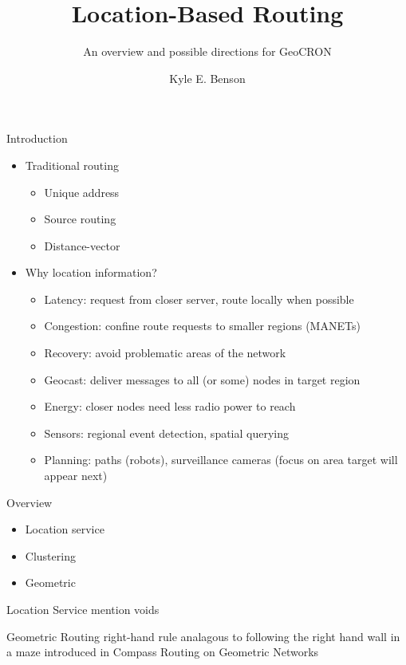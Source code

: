 \documentclass{beamer}
\begin{document}
\title[Location routing]{Location-Based Routing}
\subtitle{An overview and possible directions for GeoCRON}
\author[K. Benson]{Kyle E. Benson}


\begin{frame}
	\titlepage
\end{frame}


\begin{frame}{Introduction}

\begin{itemize}
	\item Traditional routing
	\begin{itemize}
		\item Unique address
		\item Source routing
		\item Distance-vector
	\end{itemize}
	
	\item Why location information?
	\begin{itemize}
		\item Latency: request from closer server, route locally when possible
		\item Congestion: confine route requests to smaller regions (MANETs)
		\item Recovery: avoid problematic areas of the network
		\item Geocast: deliver messages to all (or some) nodes in target region
		\item Energy: closer nodes need less radio power to reach
		\item Sensors: regional event detection, spatial querying
		\item Planning: paths (robots), surveillance cameras (focus on area target will appear next)
	\end{itemize}
\end{itemize}

\end{frame}


\begin{frame}{Overview}
	\begin{itemize}
		\item Location service
		\item Clustering
		\item Geometric
	\end{itemize}
\end{frame}


\begin{frame}{Location Service}
mention voids
\end{frame}


\begin{frame}{Geometric Routing}
right-hand rule analagous to following the right hand wall in a maze
introduced in Compass Routing on Geometric Networks
\end{frame}
\end{document}
